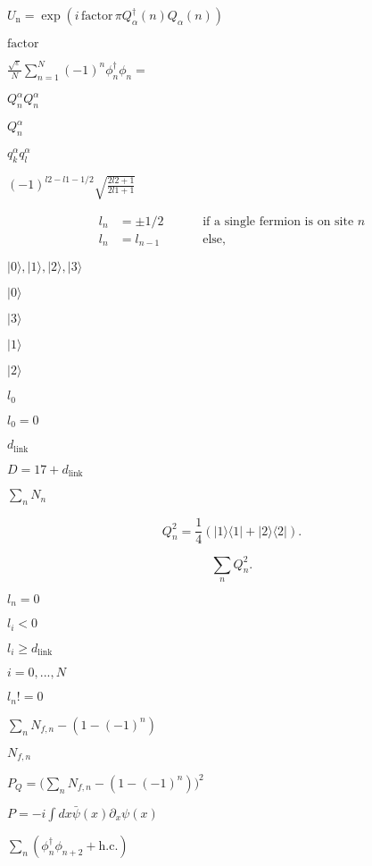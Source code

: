 \documentclass{article}
\begin{document}
{$ U_\mathrm{n}=\exp\left(i\,\mathrm{factor}\,\pi Q^\dagger_\alpha(n)Q_\alpha(n)\right) $
\pagebreak

$ \mathrm{factor} $
\pagebreak

$ \frac{\sqrt{\varepsilon}}{N}\sum_{n=1}^N (-1)^n\phi^\dagger_n\phi_n = $
\pagebreak

$ Q^{\alpha}_n Q^{\alpha}_n $
\pagebreak

$ Q^{\alpha}_n$
\pagebreak

$ q^{\alpha}_kq^{\alpha}_l $
\pagebreak

$ (-1)^{l2-l1-1/2}\sqrt{\frac{2l2+1}{2l1+1}} $
\pagebreak

\begin{eqnarray*} l_n &= \pm 1/2 \quad\quad &\mbox{ if a single fermion is on site } n \\ l_n &= l_{n-1} \quad\quad &\mbox{ else, } \end{eqnarray*}
\pagebreak

$ |0\rangle, |1\rangle, |2\rangle, |3\rangle $
\pagebreak

$ |0\rangle $
\pagebreak

$|3\rangle $
\pagebreak

$ |1\rangle $
\pagebreak

$|2\rangle $
\pagebreak

$ l_0 $
\pagebreak

$ l_0=0 $
\pagebreak

$ d_\mathrm{link}$
\pagebreak

$ D=17+d_\mathrm{link} $
\pagebreak

$ \sum_n N_n $
\pagebreak

\[ Q^2_n = \frac{1}{4} \left(|1\rangle\langle 1| + |2\rangle\langle 2|\right).\]
\pagebreak

\[ \sum_n Q^2_n .\]
\pagebreak

$ l_n=0 $
\pagebreak

$ l_i<0 $
\pagebreak

$ l_i\geq d_\mathrm{link}$
\pagebreak

$ i=0,...,N $
\pagebreak

$ l_n!=0 $
\pagebreak

$ \sum_n N_{f,n} - \left(1-(-1)^n\right) $
\pagebreak

$ N_{f,n} $
\pagebreak

$ P_Q= \bigl(\sum_n N_{f,n} - \left(1-(-1)^n\right) \bigr)^2 $
\pagebreak

$ P=-i\int dx \bar{\psi}(x)\partial_x\psi(x) $
\pagebreak

$\sum_n \left(\phi^\dagger_n\phi_{n+2} + \mbox{h.c.}\right)$
\pagebreak

}
\end{document}
